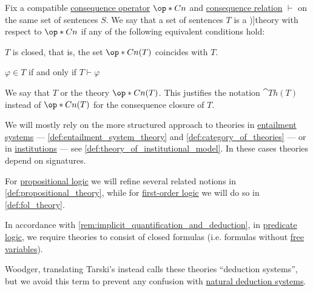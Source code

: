 \begin{definition}\label{def:logical_theory}
  Fix a compatible \hyperref[def:consequence_operator]{consequence operator} \( \op*{Cn} \) and \hyperref[def:consequence_relation]{consequence relation} \( {\vdash} \) on the same set of sentences \( S \). We say that a set of sentences \( T \) is a \term[ru=теория (\cite[def. 3.1.1]{Герасимов2014Вычислимость})]{theory} with respect to \( \op*{Cn} \) if any of the following equivalent conditions hold:
  \begin{thmenum}[series=def:logical_theory]
     \( T \) is closed, that is, the set \( \op*{Cn}(T) \) coincides with \( T \).

     \( \varphi \in T \) if and only if \( T \vdash \varphi \)
  \end{thmenum}

  We say that \( T \)  or  the theory \( \op*{Cn}(T) \). This justifies the notation \( \cat{Th}(T) \) instead of \( \op*{Cn}(T) \) for the consequence closure of \( T \).
\end{definition}
\begin{comments}
  \item We will mostly rely on the more structured approach to theories in \hyperref[def:entailment_system]{entailment systems} --- \cref{def:entailment_system_theory} and \cref{def:category_of_theories} --- or in \hyperref[def:institution]{institutions} --- see \cref{def:theory_of_institutional_model}. In these cases theories depend on signatures.

  For \hyperref[def:propositional_logic]{propositional logic} we will refine several related notions in \cref{def:propositional_theory}, while for \hyperref[def:first_order_logic]{first-order logic} we will do so in \cref{def:fol_theory}.

  \item In accordance with \cref{rem:implicit_quantification_and_deduction}, in \hyperref[con:predicate_logic]{predicate logic}, we require theories to consist of closed formulas (i.e. formulas without \hyperref[con:variable_binding]{free variables}).

  \item Woodger, translating Tarski's \cite[70]{Tarski1983Collection:MethodologyOfDeductiveSciences} instead calls these theories \enquote{deduction systems}, but we avoid this term to prevent any confusion with \hyperref[def:propositional_natural_deduction]{natural deduction systems}.
\end{comments}

